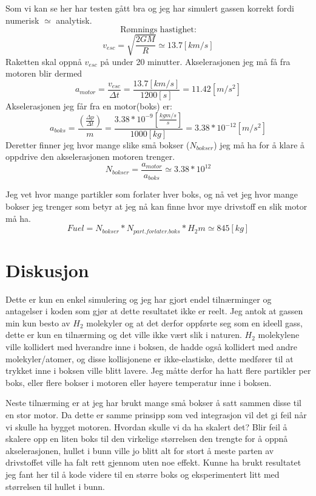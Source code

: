 \documentclass[12pt,preprint]{aastex6}
\begin{document}
Som vi kan se her har testen gått bra og jeg har simulert gassen korrekt fordi numerisk $\simeq$ analytisk.  \\
$$
\text{Rømnings hastighet:}
$$
$$ v_{esc} = \sqrt{\frac{2GM}{R}} \simeq 13.7 [km/s]$$
Raketten skal oppnå $v_{esc}$ på under 20 minutter. Akselerasjonen jeg må få fra motoren blir dermed $$a _{motor}=  \frac{v_{esc}}{\Delta t} = \frac{13.7[km/s]}{1200[s]} = 11.42[m/s^2]$$
Akselerasjonen jeg får fra en motor(boks) er: 
$$a_{boks} = \frac{\left(\frac{\Delta p}{\Delta t}\right)}{m} = \frac{3.38*10^{-9}\left[\frac{kgm/s}{s}\right]}{1000[kg]} = 3.38*10^{-12}[m/s^2]$$
Deretter finner jeg hvor mange slike små bokser ($N_{bokser}$) jeg må ha for å klare å oppdrive den akselerasjonen motoren trenger. 
$$N_{bokser} =\frac{a _{motor}}{a_{boks}} \simeq 3.38*10^{12}$$

Jeg vet hvor mange partikler som forlater hver boks, og nå vet jeg hvor mange bokser jeg trenger som betyr at jeg nå kan finne hvor mye drivstoff en slik motor må ha. $$Fuel = N_{bokser}*N_{part.forlater.boks}*H_2m \simeq 845[kg]$$

\newpage
\section{Diskusjon}
Dette er kun en enkel simulering og jeg har gjort endel tilnærminger og antagelser i koden som gjør at dette resultatet ikke er reelt. Jeg antok at gassen min kun besto av $H_2$ molekyler og at det derfor oppførte seg som en ideell gass, dette er kun en tilnærming og det ville ikke vært slik i naturen. $H_2$ molekylene ville kollidert med hverandre inne i boksen, de hadde også kollidert med andre molekyler/atomer, og disse kollisjonene er ikke-elastiske, dette medfører til at trykket inne i boksen ville blitt lavere. Jeg måtte derfor ha hatt flere partikler per boks, eller flere bokser i motoren eller høyere temperatur inne i boksen.
 
Neste tilnærming er at jeg har brukt mange små bokser å satt sammen disse til en stor motor. Da dette er samme prinsipp som ved integrasjon vil det gi feil når vi skulle ha bygget motoren. Hvordan skulle vi da ha skalert det? Blir feil å skalere opp en liten boks til den virkelige størrelsen den trengte for å oppnå akselerasjonen, hullet i bunn ville jo blitt alt for stort å meste parten av drivstoffet ville ha falt rett gjennom uten noe effekt. Kunne ha brukt resultatet jeg fant her til å kode videre til en større boks og eksperimentert litt med størrelsen til hullet i bunn.
\end{document}
